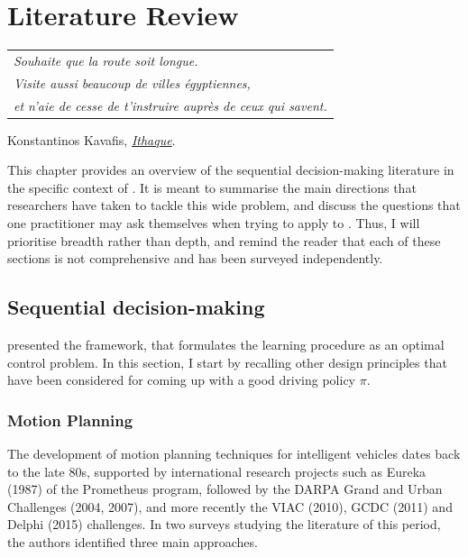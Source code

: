 
\graphicspath{{2-Chapters/2-Chapter/}}

\chapter{Literature Review}
\label{chapter:2}

\begin{flushright}
	\begin{tabular}{@{}l@{}}
		\emph{Souhaite que la route soit longue.}\\
		\hdashline
		\emph{Visite aussi beaucoup de villes égyptiennes,}\\
		\emph{et n’aie de cesse de t’instruire auprès de ceux qui savent.}\\
	\end{tabular}
	
	Konstantinos Kavafis, \href{https://eleurent.github.io/sisyphe/texts/ithaki.html}{\emph{Ithaque}}.
\end{flushright}

\abstractStartChapter{}%
This chapter provides an overview of the sequential decision-making literature in the specific context of . It is meant to summarise the main directions that researchers have taken to tackle this wide problem, and discuss the questions that one practitioner may ask themselves when trying to apply  to . Thus, I will prioritise breadth rather than depth, and remind the reader that each of these sections is not comprehensive and has been surveyed independently.
\minitocStartChapter{}

\section{Sequential decision-making}
\label{sec:sequential-decision-making}

 presented the  framework, that formulates the learning procedure as an optimal control problem. In this section, I start by recalling other design principles that have been considered for coming up with a good driving policy $\pi$.

\subsection{Motion Planning}

The development of motion planning techniques for intelligent vehicles dates back to the late 80s, supported by international research projects such as Eureka (1987) of the Prometheus program, followed by the DARPA Grand and Urban Challenges (2004, 2007), and more recently the VIAC (2010), GCDC (2011) and Delphi (2015) challenges. In two surveys \citep{Gonzalez2016,Paden2016} studying the literature of this period, the authors identified three main approaches.

